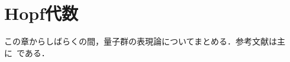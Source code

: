 \documentclass[rep_main]{subfiles}
\begin{document}
\setcounter{chapter}{6}

\chapter{Hopf代数}

この章からしばらくの間，量子群の表現論についてまとめる．参考文献は主に~\cite{Jimbo1990quantumgroup}である．
\end{document}
